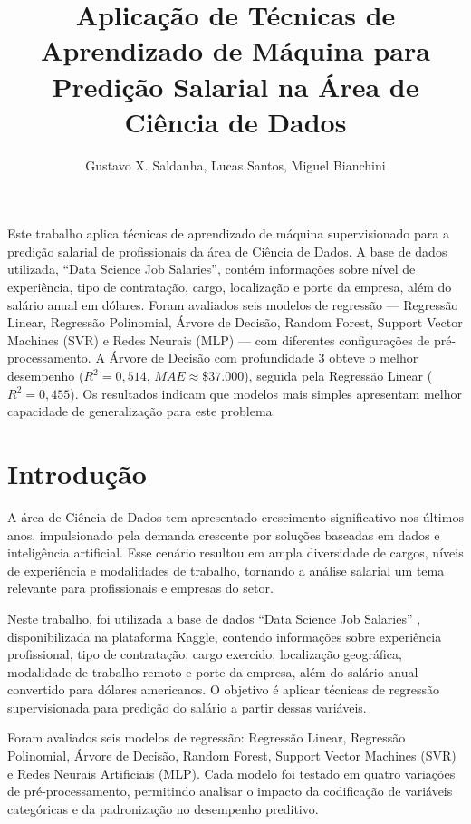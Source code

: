 \documentclass[12pt]{article}
\title{Aplicação de Técnicas de Aprendizado de Máquina para Predição Salarial na Área de Ciência de Dados}
\author{Gustavo X. Saldanha\inst{1}, Lucas Santos\inst{1}, Miguel Bianchini\inst{1} }
\begin{document}
 

\maketitle

\begin{resumo} 
Este trabalho aplica técnicas de aprendizado de máquina supervisionado para a predição salarial de profissionais da área de Ciência de Dados. A base de dados utilizada, ``Data Science Job Salaries'', contém informações sobre nível de experiência, tipo de contratação, cargo, localização e porte da empresa, além do salário anual em dólares. Foram avaliados seis modelos de regressão --- Regressão Linear, Regressão Polinomial, Árvore de Decisão, Random Forest, Support Vector Machines (SVR) e Redes Neurais (MLP) --- com diferentes configurações de pré-processamento. A Árvore de Decisão com profundidade 3 obteve o melhor desempenho ($R^2 = 0{,}514$, $MAE \approx \$37.000$), seguida pela Regressão Linear ($R^2 = 0{,}455$). Os resultados indicam que modelos mais simples apresentam melhor capacidade de generalização para este problema.
\end{resumo}

\section{Introdução}

A área de Ciência de Dados tem apresentado crescimento significativo nos últimos anos, impulsionado pela demanda crescente por soluções baseadas em dados e inteligência artificial. Esse cenário resultou em ampla diversidade de cargos, níveis de experiência e modalidades de trabalho, tornando a análise salarial um tema relevante para profissionais e empresas do setor.

Neste trabalho, foi utilizada a base de dados ``Data Science Job Salaries'' \cite{ds_salary_dataset}, disponibilizada na plataforma Kaggle, contendo informações sobre experiência profissional, tipo de contratação, cargo exercido, localização geográfica, modalidade de trabalho remoto e porte da empresa, além do salário anual convertido para dólares americanos. O objetivo é aplicar técnicas de regressão supervisionada para predição do salário a partir dessas variáveis.

Foram avaliados seis modelos de regressão: Regressão Linear, Regressão Polinomial, Árvore de Decisão, Random Forest, Support Vector Machines (SVR) e Redes Neurais Artificiais (MLP). Cada modelo foi testado em quatro variações de pré-processamento, permitindo analisar o impacto da codificação de variáveis categóricas e da padronização no desempenho preditivo.
\end{document}
